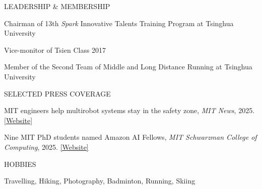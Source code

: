 \documentclass{resume} %
\begin{document}
	\begin{rSection}{LEADERSHIP \& MEMBERSHIP}
		\item Chairman of 13th \textsl{Spark} Innovative Talents Training Program at Tsinghua University
		\item Vice-monitor of Tsien Class 2017
		\item Member of the Second Team of Middle and Long Distance Running at Tsinghua University
	\end{rSection}

	\begin{rSection}{SELECTED PRESS COVERAGE}
		\item MIT engineers help multirobot systems stay in the safety zone, \textit{MIT News}, 2025. \href{https://news.mit.edu/2025/mit-engineers-help-multirobot-systems-stay-safety-zone-0131}{[Website]}
		\item Nine MIT PhD students named Amazon AI Fellows, \textit{MIT Schwarzman College of Computing}, 2025. \href{https://computing.mit.edu/news/nine-mit-phd-students-named-amazon-ai-fellows/}{[Website]}
	\end{rSection}

	\begin{rSection}{HOBBIES}
		\item Travelling, Hiking, Photography, Badminton, Running, Skiing
	\end{rSection}
	
\end{document}

